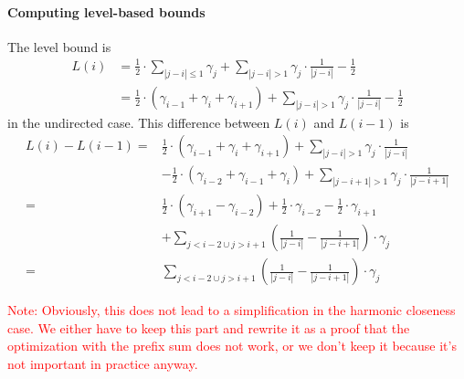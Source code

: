 \paragraph{Computing level-based bounds}
The level bound is 
\begin{align}
	L(i) &= \frac{1}{2} \cdot \sum_{|j - i| \leq 1}{\gamma_j} + \sum_{|j - i| > 1}{\gamma_j \cdot \frac{1}{|j - i|}} - \frac{1}{2} \nonumber \\
	     &= \frac{1}{2} \cdot \left(\gamma_{i - 1} + \gamma_i + \gamma_{i + 1} \right) + \sum_{|j - i| > 1}{\gamma_j \cdot \frac{1}{|j - i|}} - \frac{1}{2}
\end{align}
in the undirected case. This difference between $L(i)$ and $L(i - 1)$ is
\begin{align}
	L(i) - L(i - 1) ={}  &\frac{1}{2} \cdot \left(\gamma_{i - 1} + \gamma_i + \gamma_{i + 1} \right) + \sum_{|j - i| > 1}{\gamma_j \cdot \frac{1}{|j - i|}} \nonumber \\
	     &- \frac{1}{2} \cdot \left(\gamma_{i - 2} + \gamma_{i - 1} + \gamma_{i} \right) + \sum_{|j - i + 1| > 1}{\gamma_j \cdot \frac{1}{|j - i + 1|}} \nonumber \\
	   ={} &\frac{1}{2} \cdot (\gamma_{i + 1} - \gamma_{i - 2}) + \frac{1}{2} \cdot \gamma_{i-2} - \frac{1}{2} \cdot \gamma_{i + 1} \nonumber \\
	     &+ \sum_{j < i - 2 \cup j > i + 1}{\left(\frac{1}{|j - i|} - \frac{1}{|j - i + 1|}\right) \cdot \gamma_j} \nonumber \\
	   ={} & \sum_{j < i - 2 \cup j > i + 1}{\left(\frac{1}{|j - i|} - \frac{1}{|j - i + 1|}\right) \cdot \gamma_j}
\end{align}

\textcolor{red}{Note: Obviously, this does not lead to a simplification in the harmonic closeness case. We either have to keep this part and rewrite it as a proof that the optimization with the prefix sum does not work, or we don't keep it because it's not important in practice anyway.}


